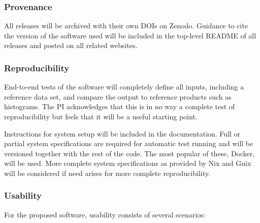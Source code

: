 \subsubsection{Provenance}
All releases will be archived with their own DOIs on Zenodo.  Guidance to cite the version of the software used will be included in the top-level README of all releases and posted on all related websites.

\subsubsection{Reproducibility}
End-to-end tests of the software will completely define all inputs, including a reference data set, and compare the output to reference products such as histograms.  The PI acknowledges that this is in no way a complete test of reproducibility but feels that it will be a useful starting point.  

Instructions for system setup will be included in the documentation.  Full or partial system specifications are required for automatic test running and will be versioned together with the rest of the code.  The most popular of these, Docker, will be used.  More complete system specifications as provided by Nix and Guix will be considered if need arises for more complete reproducibility.

\subsubsection{Usability}
For the proposed software, usability consists of several scenarios:

